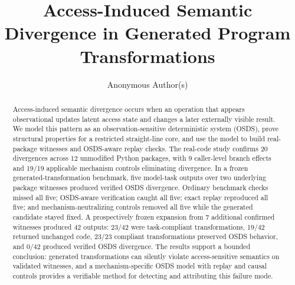 \documentclass{article}
\title{Access-Induced Semantic Divergence in Generated Program Transformations}
\author{Anonymous Author(s)}
\newcommand{\osds}{OSDS}
\begin{document}
\maketitle

\begin{abstract}
Access-induced semantic divergence occurs when an operation that appears observational updates latent access state and changes a later externally visible result. We model this pattern as an observation-sensitive deterministic system (\osds), prove structural properties for a restricted straight-line core, and use the model to build real-package witnesses and OSDS-aware replay checks. The real-code study confirms 20 divergences across 12 unmodified Python packages, with 9 caller-level branch effects and 19/19 applicable mechanism controls eliminating divergence. In a frozen generated-transformation benchmark, five model-task outputs over two underlying package witnesses produced verified OSDS divergence. Ordinary benchmark checks missed all five; OSDS-aware verification caught all five; exact replay reproduced all five; and mechanism-neutralizing controls removed all five while the generated candidate stayed fixed. A prospectively frozen expansion from 7 additional confirmed witnesses produced 42 outputs: 23/42 were task-compliant transformations, 19/42 returned unchanged code, 23/23 compliant transformations preserved OSDS behavior, and 0/42 produced verified OSDS divergence. The results support a bounded conclusion: generated transformations can silently violate access-sensitive semantics on validated witnesses, and a mechanism-specific OSDS model with replay and causal controls provides a verifiable method for detecting and attributing this failure mode.
\end{abstract}












{\small


}

\appendix




\end{document}
